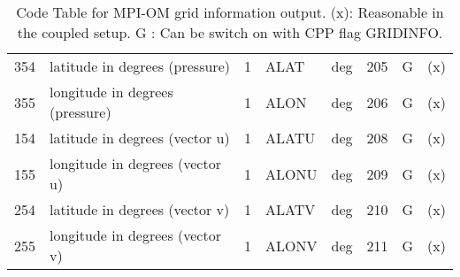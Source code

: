 \begin{table}
\begin{footnotesize}
\begin{tabular}{r|l|l|l|r|l|c|c}
354  & latitude in degrees (pressure)  &  1    &  ALAT  	&   deg     &  205     &  G    &    (x)   \\
355  & longitude in degrees (pressure) &  1    &  ALON  	&   deg     &  206     &  G    &    (x)   \\
154  & latitude in degrees (vector u)  &  1    &  ALATU 	&   deg     &  208     &  G    &    (x)   \\
155  & longitude in degrees (vector u) &  1    &  ALONU 	&   deg     &  209     &  G    &    (x)   \\
254  & latitude in degrees (vector v)  &  1    &  ALATV 	&   deg     &  210     &  G    &    (x)   \\
255  & longitude in degrees (vector v) &  1    &  ALONV 	&   deg     &  211     &  G    &    (x)   \\ 
\end{tabular}
\end{footnotesize}
\caption{Code Table for MPI-OM grid information output. \newline
(x): Reasonable in the coupled setup.\newline
 G : Can be switch on with CPP flag GRIDINFO.}
\label{tb:diagnostic:output:grid}
\end{table}

